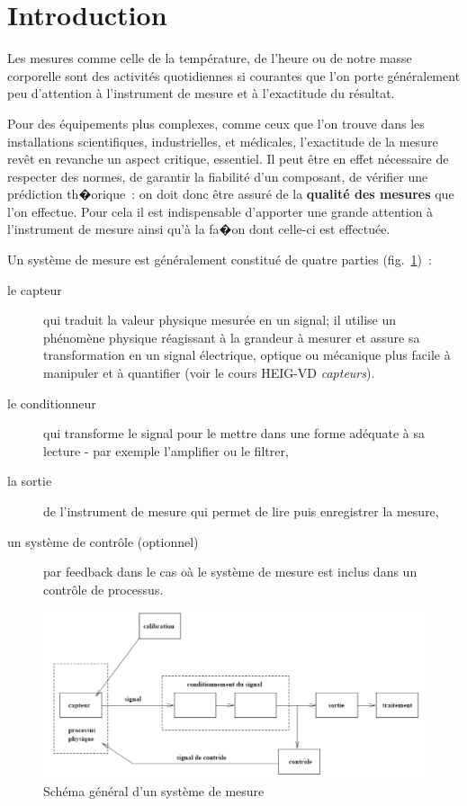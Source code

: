 \section{Introduction}

Les mesures comme celle de la température, de l'heure ou de notre masse corporelle sont des activités quotidiennes si courantes que l'on porte généralement peu d'attention à l'instrument de mesure et à l'exactitude du résultat.

Pour des équipements plus complexes, comme ceux que l'on trouve dans les installations scientifiques, industrielles, et médicales, l'exactitude de la mesure revêt en revanche un aspect critique, essentiel. Il peut être en effet nécessaire de respecter des normes, de garantir la fiabilité d'un composant, de vérifier une prédiction th�orique~: on doit donc être assuré de la \textbf{qualité des mesures} que l'on effectue. Pour cela il est indispensable d'apporter une grande attention à l'instrument de mesure ainsi qu'à la fa�on dont celle-ci est effectuée.

Un système de mesure est généralement constitué de quatre parties (fig.~\ref{fig:sysmes})~:
\begin{description}
\item[le capteur] qui traduit la valeur physique mesurée en un signal; il utilise un phénomène physique réagissant à la grandeur à mesurer et assure sa transformation en un signal électrique, optique ou mécanique plus facile à manipuler et à quantifier (voir le cours HEIG-VD \textit{capteurs}).
\item[le conditionneur] qui transforme le signal pour le mettre dans une forme adéquate à sa lecture - par exemple l'amplifier ou le filtrer,
\item[la sortie] de l'instrument de mesure qui permet de lire puis enregistrer la mesure,
\item[un système de contrôle (optionnel)] par feedback dans le cas oà le système de mesure est inclus dans un contrôle de processus.
\end{description}
\begin{figure}
   \centering
   \includegraphics[width=20cm]{assets/figures/systemeMesure.pdf}
   \caption{Schéma général d'un système de mesure}
   \label{fig:sysmes}
\end{figure}

